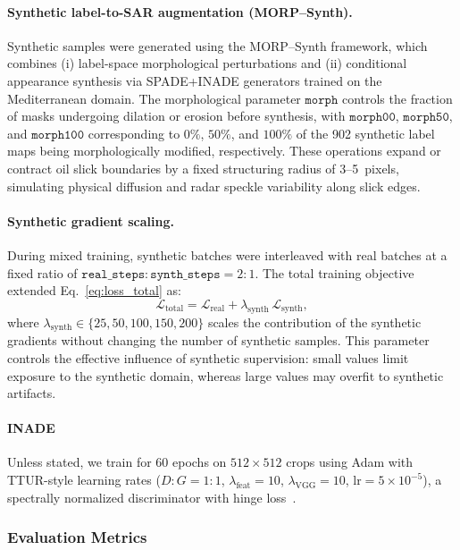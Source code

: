 \documentclass[12pt]{article}
\begin{document}
\paragraph{Synthetic label-to-SAR augmentation (MORP–Synth).}
Synthetic samples were generated using the MORP–Synth framework, which combines 
(i) label-space morphological perturbations and 
(ii) conditional appearance synthesis via SPADE+INADE generators trained on the Mediterranean domain.
The morphological parameter $\texttt{morph}$ controls the fraction of masks 
undergoing dilation or erosion before synthesis, with 
$\texttt{morph00}$, $\texttt{morph50}$, and $\texttt{morph100}$ 
corresponding to $0\%$, $50\%$, and $100\%$ of the 902 synthetic label maps 
being morphologically modified, respectively.
These operations expand or contract oil slick boundaries by a fixed structuring radius 
of 3–5~pixels, simulating physical diffusion and radar speckle variability along slick edges.

\paragraph{Synthetic gradient scaling.}
During mixed training, synthetic batches were interleaved with real batches 
at a fixed ratio of $\texttt{real\_steps}:\texttt{synth\_steps}=2:1$.
The total training objective extended Eq.~\ref{eq:loss_total} as:
\[
\mathcal{L}_{\text{total}}
 = \mathcal{L}_{\text{real}} + \lambda_{\text{synth}} \, \mathcal{L}_{\text{synth}},
\]
where $\lambda_{\text{synth}}\in\{25,50,100,150,200\}$ scales the contribution 
of the synthetic gradients without changing the number of synthetic samples.
This parameter controls the effective influence of synthetic supervision: 
small values limit exposure to the synthetic domain, 
whereas large values may overfit to synthetic artifacts.

\paragraph{INADE}
Unless stated, we train for 60 epochs on $512{\times}512$ crops using Adam with TTUR-style learning rates
($D{:}G=1{:}1$, $\lambda_\text{feat}{=}10$, $\lambda_\text{VGG}{=}10$, $\text{lr}{=}5{\times}10^{-5}$),
a spectrally normalized discriminator with hinge loss~\cite{miyato2018spectral,heusel2017ttur}.





\subsubsection{Evaluation Metrics}
\label{sec:evaluation}
\end{document}

